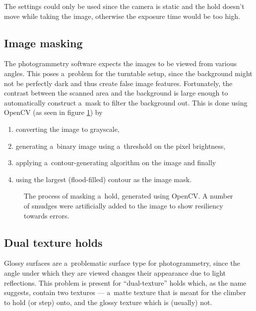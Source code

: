 The settings could only be used since the camera is static and the hold doesn't move while taking the image, otherwise the exposure time would be too high.

\subsection{Image masking}
The photogrammetry software expects the images to be viewed from various angles.
This poses a~problem for the turntable setup, since the background might not be perfectly dark and thus create false image features.
Fortunately, the contrast between the scanned area and the background is large enough to automatically construct a~mask to filter the background out.
This is done using OpenCV \cite{opencv} (as seen in figure \ref{fig:mask}) by
\begin{enumerate}
	\item converting the image to grayscale,
	\item generating a~binary image using a~threshold on the pixel brightness,
	\item applying a~contour-generating algorithm \cite{suzuki1985topological} on the image and finally
	\item using the largest (flood-filled) contour as the image mask.
\end{enumerate}

\begin{figure}[h]
	\centering
	\hfill
	\hfill
	\hfill
	\hfill
	\caption{The process of masking a~hold, generated using OpenCV. A number of smudges were artificially added to the image to show resiliency towards errors.}%
	\label{fig:mask}
\end{figure}

\subsection{Dual texture holds}\label{sec:dual}
Glossy surfaces are a~problematic surface type for photogrammetry, since the angle under which they are viewed changes their appearance due to light reflections.
This problem is present for ``dual-texture'' holds which, as the name suggests, contain two textures --- a~matte texture that is meant for the climber to hold (or step) onto, and the glossy texture which is (usually) not.

